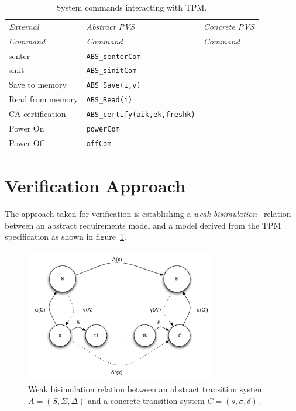 \documentclass[10pt]{article}
\begin{document}
\begin{table}[hbtp]
  \centering
  \begin{tabular}{lll}
    \hline
    \emph{External}& \emph{Abstract PVS} & \emph{Concrete PVS} \\
    \emph{Command} & \emph{Command} & \emph{Command} \\ \hline
    \textsf{senter} & \verb+ABS_senterCom+ & \\
    \textsf{sinit} & \verb+ABS_sinitCom+ & \\
    Save to memory & \verb+ABS_Save(i,v)+ & \\
    Read from memory & \verb+ABS_Read(i)+ & \\
    CA certification & \verb+ABS_certify(aik,ek,freshk)+ & \\
    Power On & \verb+powerCom+ & \\
    Power Off  & \verb+offCom+ & \\
    \hline
  \end{tabular}
  \caption{System commands interacting with TPM.}
  \label{tab:commands-to-pvs}
\end{table}


\section{Verification Approach}

The approach taken for verification is establishing a \emph{weak
  bisimulation}~\citep{Sangiorgi:12:Introduction-to} relation between
an abstract requirements model and a model derived from the TPM
specification as shown in figure~\ref{fig:bisimulation}.

\begin{figure}[hbtp]
  \centering
  \includegraphics[width=0.75\textwidth]{figures/bisimulation.pdf}
  \caption{Weak bisimulation relation between an abstract transition
    system $A=(S,\Sigma,\Delta)$ and a concrete transition system
    $C=(s,\sigma,\delta)$.}
  \label{fig:bisimulation} 
\end{figure}
\end{document}
